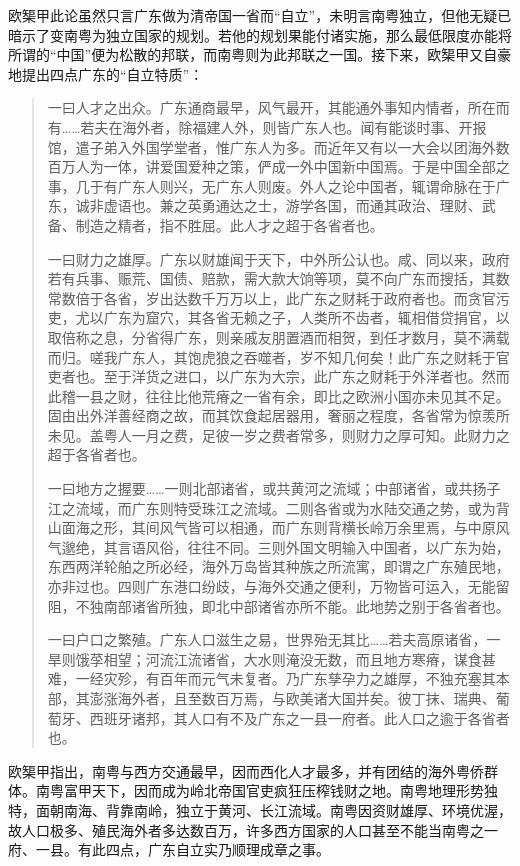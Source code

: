 欧榘甲此论虽然只言广东做为清帝国一省而“自立”，未明言南粤独立，但他无疑已暗示了变南粤为独立国家的规划。若他的规划果能付诸实施，那么最低限度亦能将所谓的“中国”便为松散的邦联，而南粤则为此邦联之一国。接下来，欧榘甲又自豪地提出四点广东的“自立特质”：

\begin{quote}
	
一曰人才之出众。广东通商最早，风气最开，其能通外事知内情者，所在而有……若夫在海外者，除福建人外，则皆广东人也。闻有能谈时事、开报馆，遣子弟入外国学堂者，惟广东人为多。而近年又有以一大会以团海外数百万人为一体，讲爱国爱种之策，俨成一外中国新中国焉。于是中国全部之事，几于有广东人则兴，无广东人则废。外人之论中国者，辄谓命脉在于广东，诚非虚语也。兼之英勇通达之士，游学各国，而通其政治、理财、武备、制造之精者，指不胜屈。此人才之超于各省者也。

一曰财力之雄厚。广东以财雄闻于天下，中外所公认也。咸、同以来，政府若有兵事、赈荒、国债、赔款，需大款大饷等项，莫不向广东而搜括，其数常数倍于各省，岁出达数千万万以上，此广东之财耗于政府者也。而贪官污吏，尤以广东为窟穴，其各省无赖之子，人类所不齿者，辄相借贷捐官，以取倍称之息，分省得广东，则亲戚友朋置酒而相贺，到任才数月，莫不满载而归。嗟我广东人，其饱虎狼之吞噬者，岁不知几何矣！此广东之财耗于官吏者也。至于洋货之进口，以广东为大宗，此广东之财耗于外洋者也。然而此稽一县之财，往往比他荒瘠之一省有余，即比之欧洲小国亦未见其不足。固由出外洋善经商之故，而其饮食起居器用，奢丽之程度，各省常为惊羡所未见。盖粤人一月之费，足彼一岁之费者常多，则财力之厚可知。此财力之超于各省者也。

一曰地方之握要……一则北部诸省，或共黄河之流域；中部诸省，或共扬子江之流域，而广东则特受珠江之流域。二则各省或为水陆交通之势，或为背山面海之形，其间风气皆可以相通，而广东则背横长岭万余里焉，与中原风气邈绝，其言语风俗，往往不同。三则外国文明输入中国者，以广东为始，东西两洋轮舶之所必经，海外万岛皆其种族之所流寓，即谓之广东殖民地，亦非过也。四则广东港口纷歧，与海外交通之便利，万物皆可运入，无能留阻，不独南部诸省所独，即北中部诸省亦所不能。此地势之别于各省者也。

一曰户口之繁殖。广东人口滋生之易，世界殆无其比……若夫高原诸省，一旱则饿莩相望；河流江流诸省，大水则淹没无数，而且地方寒瘠，谋食甚难，一经灾殄，有百年而元气未复者。乃广东孳孕力之雄厚，不独充塞其本部，其澎涨海外者，且至数百万焉，与欧美诸大国并矣。彼丁抹、瑞典、葡萄牙、西班牙诸邦，其人口有不及广东之一县一府者。此人口之逾于各省者也。

\end{quote}
欧榘甲指出，南粤与西方交通最早，因而西化人才最多，并有团结的海外粤侨群体。南粤富甲天下，因而成为岭北帝国官吏疯狂压榨钱财之地。南粤地理形势独特，面朝南海、背靠南岭，独立于黄河、长江流域。南粤因资财雄厚、环境优渥，故人口极多、殖民海外者多达数百万，许多西方国家的人口甚至不能当南粤之一府、一县。有此四点，广东自立实乃顺理成章之事。

